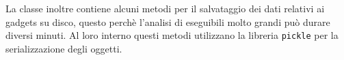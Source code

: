La classe inoltre contiene alcuni metodi per il salvataggio dei dati
relativi ai gadgets su disco, questo perchè l'analisi di eseguibili
molto grandi può durare diversi minuti. Al loro interno questi metodi
utilizzano la libreria \lstinline{pickle} per la serializzazione degli
oggetti.







